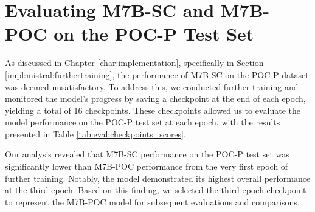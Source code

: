 \documentclass[english, ba, kiv, he, iso690numb, pdf, viewonly]{fasthesis}
\begin{document}
\section{Evaluating M7B-SC and M7B-POC on the POC-P Test Set}
As discussed in Chapter \ref{char:implementation}, specifically in Section \ref{impl:mistral:furthertraining}, the performance of M7B-SC on the POC-P dataset was deemed unsatisfactory. To address this, we conducted further training and monitored the model's progress by saving a checkpoint at the end of each epoch, yielding a total of 16 checkpoints. These checkpoints allowed us to evaluate the model performance on the POC-P test set at each epoch, with the results presented in Table \ref{tab:eval:checkpoints_scores}.

Our analysis revealed that M7B-SC performance on the POC-P test set was significantly lower than M7B-POC performance from the very first epoch of further training. Notably, the model demonstrated its highest overall performance at the third epoch. Based on this finding, we selected the third epoch checkpoint to represent the M7B-POC model for subsequent evaluations and comparisons.
\end{document}
